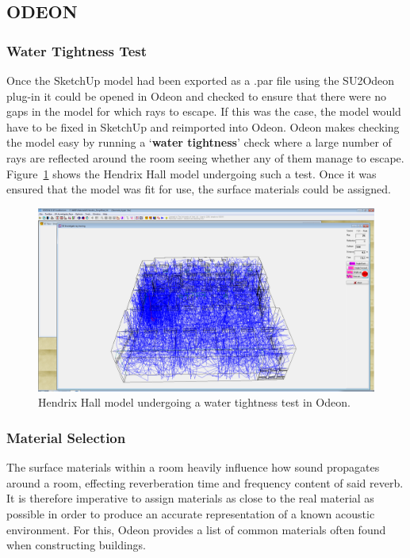 \documentclass[../../main.tex]{subfiles}
\begin{document}
\subsection{ODEON}
	\label{odeon}
	\subsubsection{Water Tightness Test}
		Once the SketchUp model had been exported as a .par file using the SU2Odeon plug-in \cite{SU2Odeon} it could be opened in Odeon and checked to ensure that there were no gaps in the model for which rays to escape. If this was the case, the model would have to be fixed in SketchUp and reimported into Odeon. Odeon makes checking the model easy by running a `\textbf{water tightness}' check where a large number of rays are reflected around the room seeing whether any of them manage to escape. Figure~\ref{watertight} shows the Hendrix Hall model undergoing such a test. Once it was ensured that the model was fit for use, the surface materials could be assigned.

		\begin{figure}[H]
			\center\includegraphics[scale = 0.3]{Sections/Implementation/Odeon/images/OdeonRays/waterTight2.PNG}
			\caption{Hendrix Hall model undergoing a water tightness test in Odeon.}
			\label{watertight}
		\end{figure}

	\subsubsection{Material Selection}
	\label{odeon:materials}
		The surface materials within a room heavily influence how sound propagates around a room, effecting reverberation time and frequency content of said reverb. It is therefore imperative to assign materials as close to the real material as possible in order to produce an accurate representation of a known acoustic environment. For this, Odeon provides a list of common materials often found when constructing buildings.
\end{document}
